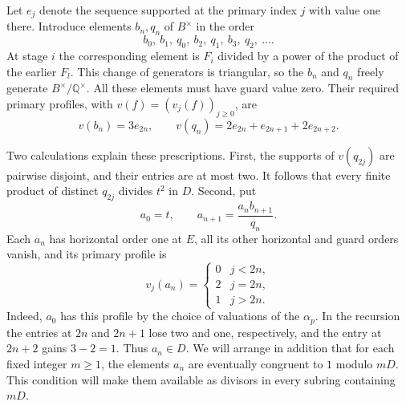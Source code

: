 Let $e_j$ denote the sequence supported at the primary index $j$ with value one there.
Introduce elements $b_n, q_n$ of $B^{\times}$ in the order
\[
    b_0,\ b_1,\ q_0,\ b_2,\ q_1,\ b_3,\ q_2,\ \ldots.
\]
At stage $i$ the corresponding element is $F_i$ divided by a power of the product of the earlier $F_l$.
This change of generators is triangular, so the $b_n$ and $q_n$ freely generate $B^{\times}/\mathbb{Q}^{\times}$.
All these elements must have guard value zero.
Their required primary profiles, with $v(f) = (v_j(f))_{j \ge 0}$, are
\begin{equation}
    \label{eq:profiles}
    v(b_n) = 3e_{2n},
    \qquad
    v(q_n) = 2e_{2n} + e_{2n + 1} + 2e_{2n + 2}.
\end{equation}

Two calculations explain these prescriptions.
First, the supports of $v(q_{2j})$ are pairwise disjoint, and their entries are at most two.
It follows that every finite product of distinct $q_{2j}$ divides $t^2$ in $D$.
Second, put
\[
    a_0 = t,
    \qquad
    a_{n + 1} = \frac{a_n b_{n + 1}}{q_n}.
\]
Each $a_n$ has horizontal order one at $E$, all its other horizontal and guard orders vanish, and its primary profile is
\begin{equation}
    \label{eq:atoms-profile}
    v_j(a_n) =
    \begin{cases}
        0 & j < 2n,\\
        2 & j = 2n,\\
        1 & j > 2n.
    \end{cases}
\end{equation}
Indeed, $a_0$ has this profile by the choice of valuations of the $\alpha_p$.
In the recursion the entries at $2n$ and $2n + 1$ lose two and one, respectively, and the entry at $2n + 2$ gains $3 - 2 = 1$.
Thus $a_n \in D$.
We will arrange in addition that for each fixed integer $m \ge 1$, the elements $a_n$ are eventually congruent to $1$ modulo $mD$.
This condition will make them available as divisors in every subring containing $mD$.
